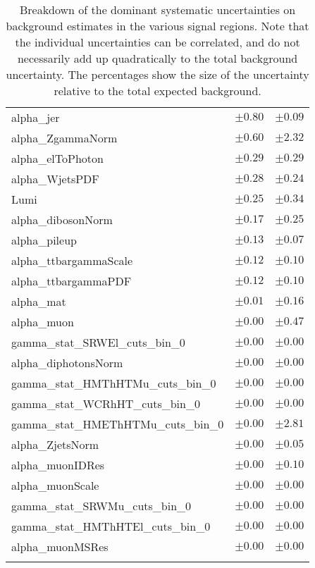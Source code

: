 \begin{table}
\begin{center}
\begin{tabular*}{\textwidth}{@{\extracolsep{\fill}}lcc}
alpha\_jer         & $\pm 0.80$          & $\pm 0.09$       \\
alpha\_ZgammaNorm         & $\pm 0.60$          & $\pm 2.32$       \\
alpha\_elToPhoton         & $\pm 0.29$          & $\pm 0.29$       \\
alpha\_WjetsPDF         & $\pm 0.28$          & $\pm 0.24$       \\
Lumi         & $\pm 0.25$          & $\pm 0.34$       \\
alpha\_dibosonNorm         & $\pm 0.17$          & $\pm 0.25$       \\
alpha\_pileup         & $\pm 0.13$          & $\pm 0.07$       \\
alpha\_ttbargammaScale         & $\pm 0.12$          & $\pm 0.10$       \\
alpha\_ttbargammaPDF         & $\pm 0.12$          & $\pm 0.10$       \\
alpha\_mat         & $\pm 0.01$          & $\pm 0.16$       \\
alpha\_muon         & $\pm 0.00$          & $\pm 0.47$       \\
gamma\_stat\_SRWEl\_cuts\_bin\_0         & $\pm 0.00$          & $\pm 0.00$       \\
alpha\_diphotonsNorm         & $\pm 0.00$          & $\pm 0.00$       \\
gamma\_stat\_HMThHTMu\_cuts\_bin\_0         & $\pm 0.00$          & $\pm 0.00$       \\
gamma\_stat\_WCRhHT\_cuts\_bin\_0         & $\pm 0.00$          & $\pm 0.00$       \\
gamma\_stat\_HMEThHTMu\_cuts\_bin\_0         & $\pm 0.00$          & $\pm 2.81$       \\
alpha\_ZjetsNorm         & $\pm 0.00$          & $\pm 0.05$       \\
alpha\_muonIDRes         & $\pm 0.00$          & $\pm 0.10$       \\
alpha\_muonScale         & $\pm 0.00$          & $\pm 0.00$       \\
gamma\_stat\_SRWMu\_cuts\_bin\_0         & $\pm 0.00$          & $\pm 0.00$       \\
gamma\_stat\_HMThHTEl\_cuts\_bin\_0         & $\pm 0.00$          & $\pm 0.00$       \\
alpha\_muonMSRes         & $\pm 0.00$          & $\pm 0.00$       \\
\noalign{\smallskip}\hline\noalign{\smallskip}
\end{tabular*}
\end{center}
\caption[Breakdown of uncertainty on background estimates]{
Breakdown of the dominant systematic uncertainties on background estimates in the various signal regions.
Note that the individual uncertainties can be correlated, and do not necessarily add up quadratically to 
the total background uncertainty. The percentages show the size of the uncertainty relative to the total expected background.
\label{table.results.bkgestimate.uncertainties.HMEThHTEl_HMEThHTMu}}
\end{table}
%
